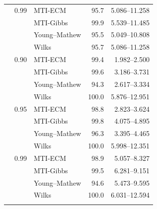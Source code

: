 \begin{longtable}{@{}rrlrr@{}}
\addlinespace[0.3em]
500 & 0.99 & MTI-ECM & 95.7 & 5.086--11.258 \\
 &  & MTI-Gibbs & 99.9 & 5.539--11.485 \\
 &  & Young--Mathew & 95.5 & 5.049--10.808 \\
 &  & Wilks & 95.7 & 5.086--11.258 \\
\addlinespace[0.3em]
1000 & 0.90 & MTI-ECM & 99.4 & 1.982--2.500 \\
 &  & MTI-Gibbs & 99.6 & 3.186--3.731 \\
 &  & Young--Mathew & 94.3 & 2.617--3.334 \\
 &  & Wilks & 100.0 & 5.876--12.951 \\
\addlinespace[0.3em]
1000 & 0.95 & MTI-ECM & 98.8 & 2.823--3.624 \\
 &  & MTI-Gibbs & 99.8 & 4.075--4.895 \\
 &  & Young--Mathew & 96.3 & 3.395--4.465 \\
 &  & Wilks & 100.0 & 5.998--12.351 \\
\addlinespace[0.3em]
1000 & 0.99 & MTI-ECM & 98.9 & 5.057--8.327 \\
 &  & MTI-Gibbs & 99.5 & 6.281--9.151 \\
 &  & Young--Mathew & 94.6 & 5.473--9.595 \\
 &  & Wilks & 100.0 & 6.031--12.594 \\
\addlinespace[0.3em]
\end{longtable}
\clearpage
